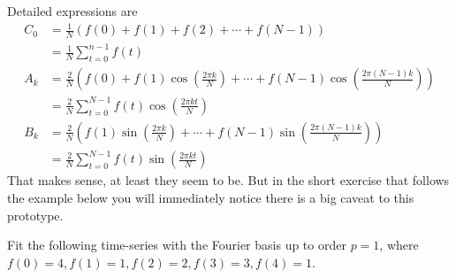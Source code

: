 Detailed expressions are
\begin{align}
C_0 &= \frac{1}{N}(f(0) + f(1) + f(2) + \cdots + f(N-1)) \nonumber \\
&= \frac{1}{N}\sum_{t=0}^{n-1} f(t) \label{eqn:protoDFTc}  \\
A_k &= \frac{2}{N}(f(0) + f(1)\cos(\frac{2\pi k}{N}) + \cdots + f(N-1)\cos(\frac{2\pi (N-1)k}{N})) \nonumber \\
&= \frac{2}{N}\sum_{t=0}^{N-1} f(t)\cos(\frac{2\pi kt}{N}) \label{eqn:protoDFTa} \\
B_k &= \frac{2}{N}(f(1)\sin(\frac{2\pi k}{N}) + \cdots + f(N-1)\sin(\frac{2\pi (N-1)k}{N})) \nonumber \\
&= \frac{2}{N}\sum_{t=0}^{N-1} f(t)\sin(\frac{2\pi kt}{N}) \label{eqn:protoDFTb}
\end{align}
That makes sense, at least they seem to be. But in the short exercise that follows the example below you will immediately notice there is a big caveat to this prototype.
\begin{exmp}
\label{exmp:ex11.2.1}
Fit the following time-series with the Fourier basis up to order $p=1$, where $f(0) = 4, f(1) = 1, f(2) = 2, f(3) = 3, f(4) = 1$.
\end{exmp}
